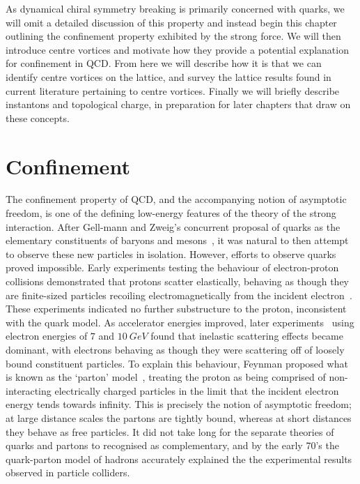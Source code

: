 As dynamical chiral symmetry breaking is primarily concerned with quarks, we will omit a detailed discussion of this property and instead begin this chapter outlining the confinement property exhibited by the strong force. We will then introduce centre vortices and motivate how they provide a potential explanation for confinement in QCD. From here we will describe how it is that we can identify centre vortices on the lattice, and survey the lattice results found in current literature pertaining to centre vortices. Finally we will briefly describe instantons and topological charge, in preparation for later chapters that draw on these concepts.  

\section{Confinement}\label{sec:Confinement}
The confinement property of QCD, and the accompanying notion of asymptotic freedom, is one of the defining low-energy features of the theory of the strong interaction. After Gell-mann and Zweig's concurrent proposal of quarks as the elementary constituents of baryons and mesons~\cite{GellMann:1964nj,Zweig:1964jf}, it was natural to then attempt to observe these new particles in isolation. However, efforts to observe quarks proved impossible. Early experiments testing the behaviour of electron-proton collisions demonstrated that protons scatter elastically, behaving as though they are finite-sized particles recoiling electromagnetically from the incident electron~\cite{Hofstadter:1956qs}. These experiments indicated no further substructure to the proton, inconsistent with the quark model. As accelerator energies improved, later experiments~\cite{Bloom:1969kc, Breidenbach:1969kd} using electron energies of $7$ and $10~\si{GeV}$ found that inelastic scattering effects became dominant, with electrons behaving as though they were scattering off of loosely bound constituent particles. To explain this behaviour, Feynman proposed what is known as the `parton' model~\cite{Feynman:1969ej}, treating the proton as being comprised of non-interacting electrically charged particles in the limit that the incident electron energy tends towards infinity. This is precisely the notion of asymptotic freedom; at large distance scales the partons are tightly bound, whereas at short distances they behave as free particles. It did not take long for the separate theories of quarks and partons to recognised as complementary, and by the early 70's the quark-parton model of hadrons accurately explained the the experimental results observed in particle colliders.\\

